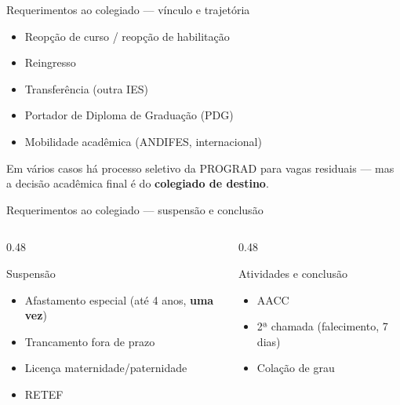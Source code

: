 \documentclass[aspectratio=169]{beamer}
\newcommand{\impt}[1]{\textcolor{maccent}{\textbf{#1}}}
\newcommand{\ntc}[1]{\textcolor{mprimary}{#1}}
\begin{document}
\begin{frame}{Requerimentos ao colegiado --- vínculo e trajetória}
  \begin{itemize}
    \item Reopção de curso / reopção de habilitação
    \item Reingresso
    \item Transferência (outra IES)
    \item Portador de Diploma de Graduação (PDG)
    \item Mobilidade acadêmica (ANDIFES, internacional)
  \end{itemize}

  \vspace{0.3cm}
   
  \ntc{Em vários casos há processo seletivo da PROGRAD para vagas residuais --- mas a decisão acadêmica final é do \impt{colegiado de destino}.}
\end{frame}

\begin{frame}{Requerimentos ao colegiado --- suspensão e conclusão}
  \begin{columns}[T,onlytextwidth]
    \begin{column}{0.48\textwidth}
      \begin{block}{Suspensão}
        \begin{itemize}
          \item Afastamento especial (até 4 anos, \impt{uma vez})
          \item Trancamento fora de prazo
          \item Licença maternidade/paternidade
          \item RETEF
        \end{itemize}
      \end{block}
    \end{column}
    \begin{column}{0.48\textwidth}
      \begin{block}{Atividades e conclusão}
        \begin{itemize}
          \item AACC
          \item 2ª chamada (falecimento, 7 dias)
          \item Colação de grau
        \end{itemize}
      \end{block}
    \end{column}
  \end{columns}
\end{frame}
\end{document}
